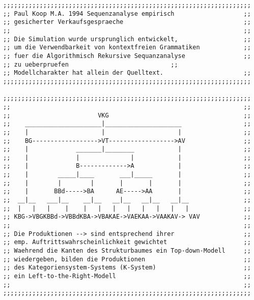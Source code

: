 \documentclass[12pt]{article}
\begin{document}
\begin{verbatim}
;;;;;;;;;;;;;;;;;;;;;;;;;;;;;;;;;;;;;;;;;;;;;;;;;;;;;;;;;;;;;;;;;;;;
;; Paul Koop M.A. 1994 Sequenzanalyse empirisch                   ;;
;; gesicherter Verkaufsgespraeche                                 ;;
;;                                                                ;;
;; Die Simulation wurde ursprunglich entwickelt,                  ;;
;; um die Verwendbarkeit von kontextfreien Grammatiken            ;;
;; fuer die Algorithmisch Rekursive Sequanzanalyse                ;;
;; zu ueberpruefen					          ;;
;; Modellcharakter hat allein der Quelltext.                      ;;
;;;;;;;;;;;;;;;;;;;;;;;;;;;;;;;;;;;;;;;;;;;;;;;;;;;;;;;;;;;;;;;;;;;;

;;;;;;;;;;;;;;;;;;;;;;;;;;;;;;;;;;;;;;;;;;;;;;;;;;;;;;;;;;;;;;;;;;;;
;;                                                                ;;
;;                        VKG                                     ;;
;;    _____________________|_____________________                 ;;
;;    |                    |                    |                 ;;
;;    BG------------------>VT------------------>AV                ;;
;;    |             _______|________            |                 ;;
;;    |             |              |            |                 ;;
;;    |             B------------->A            |                 ;;
;;    |        _____|____       ___|_____       |                 ;;
;;    |        |        |       |       |       |                 ;;
;;    |       BBd----->BA      AE----->AA       |                 ;;
;;  __|__   ___|__    __|__   __|__   __|__   __|__               ;;
;;  |   |   |    |    |   |   |   |   |   |   |   |               ;;
;; KBG->VBGKBBd->VBBdKBA->VBAKAE->VAEKAA->VAAKAV-> VAV            ;;
;;                                                                ;;
;; Die Produktionen --> sind entsprechend ihrer                   ;;
;; emp. Auftrittswahrscheinlichkeit gewichtet                     ;;
;; Waehrend die Kanten des Strukturbaumes ein Top-down-Modell     ;;
;; wiedergeben, bilden die Produktionen                           ;;
;; des Kategoriensystem-Systems (K-System)                        ;;
;; ein Left-to-the-Right-Modell                                   ;;                                                               
;;                                                                ;;
;;;;;;;;;;;;;;;;;;;;;;;;;;;;;;;;;;;;;;;;;;;;;;;;;;;;;;;;;;;;;;;;;;;;


\end{verbatim}
\end{document}
